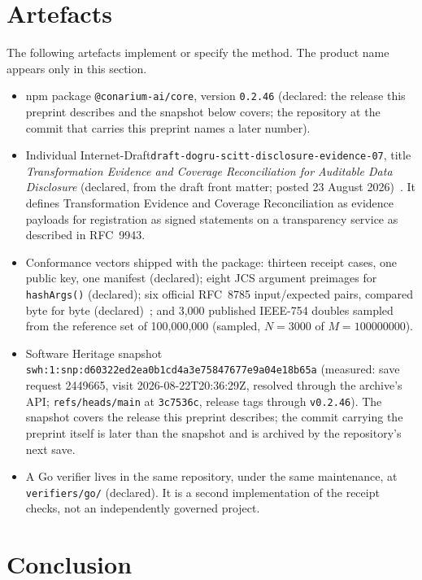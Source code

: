 \documentclass[11pt]{article}
\begin{document}
\section{Artefacts}

The following artefacts implement or specify the method. The product name appears only in this section.

\begin{itemize}
\item npm package \texttt{@conarium-ai/core}, version \texttt{0.2.46} (declared: the release this preprint describes and the snapshot below covers; the repository at the commit that carries this preprint names a later number).
\item Individual Internet-Draft\newline \texttt{draft-dogru-scitt-disclosure-evidence-07}, title \emph{Transformation Evidence and Coverage Reconciliation for Auditable Data Disclosure} (declared, from the draft front matter; posted 23 August 2026)~\cite{draft-dogru-scitt-07}. It defines Transformation Evidence and Coverage Reconciliation as evidence payloads for registration as signed statements on a transparency service as described in RFC~9943.
\item Conformance vectors shipped with the package: thirteen receipt cases, one public key, one manifest (declared); eight JCS argument preimages for \texttt{hashArgs()} (declared); six official RFC~8785 input/expected pairs, compared byte for byte (declared)~\cite{rfc8785}; and 3,000 published IEEE-754 doubles sampled from the reference set of 100,000,000 (sampled, $N = 3000$ of $M = 100000000$).
\item Software Heritage snapshot \texttt{swh:1:snp:}\allowbreak\texttt{d60322ed2ea0b1cd4a3e7584}\allowbreak\texttt{7677e9a04e18b65a} (measured: save request 2449665, visit 2026-08-22T20:36:29Z, resolved through the archive's API; \texttt{refs/heads/main} at \texttt{3c7536c}, release tags through \texttt{v0.2.46}). The snapshot covers the release this preprint describes; the commit carrying the preprint itself is later than the snapshot and is archived by the repository's next save.
\item A Go verifier lives in the same repository, under the same maintenance, at \texttt{verifiers/go/} (declared). It is a second implementation of the receipt checks, not an independently governed project.
\end{itemize}

\section{Conclusion}
\end{document}
